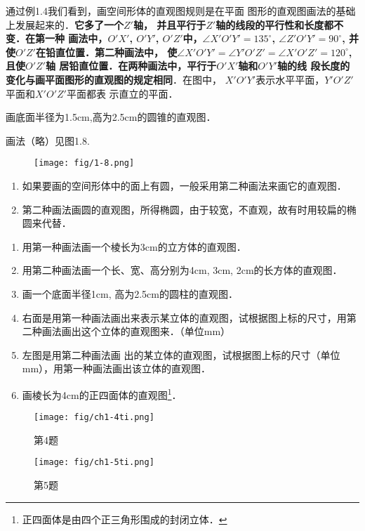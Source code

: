 通过例1.4我们看到，画空间形体的直观图规则是在平面
图形的直观图画法的基础上发展起来的．\textbf{它多了一个$Z'$轴，
并且平行于$Z'$轴的线段的平行性和长度都不变．在第一种
画法中，$O'X'$, $O'Y'$, $O'Z'$中，$\angle X'O'Y'=135^{\circ}$,
 $\angle Z'O'Y'=90^{\circ}$, 并使$O'Z'$在铅直位置．第二种画法中，
使$\angle X'O'Y'=\angle Y'O'Z'=\angle X'O'Z'=120^{\circ}$, 且使$O'Z'$轴
居铅直位置．在两种画法中，平行于$O'X'$轴和$O'Y'$轴的线
段长度的变化与画平面图形的直观图的规定相同}．在图中，
$X'O'Y'$表示水平平面，$Y'O'Z'$平面和$X'O'Z'$平面都表
示直立的平面．

\begin{example}
画底面半径为1.5cm,高为2.5cm的圆锥的直观图．

画法（略）见图1.8.
\begin{figure}[htp]
    \centering
    \texttt{[image: fig/1-8.png]}
    \caption{}
\end{figure}
\end{example}

\begin{rmk}
\begin{enumerate}
    \item 如果要画的空间形体中的面上有圆，一般采用第二种画法来画它的直观图．
    \item 第二种画法画圆的直观图，所得椭圆，由于较宽，不直观，故有时用较扁的椭圆来代替．
\end{enumerate}
\end{rmk}


\begin{ex}
\begin{enumerate}
    \item 用第一种画法画一个棱长为3cm的立方体的直观图．
    \item 用第二种画法画一个长、宽、高分别为4cm, 3cm, 2cm的长方体的直观图．
    \item 画一个底面半径1cm, 高为2.5cm的圆柱的直观图．
    \item 右面是用第一种画法画出来表示某立体的直观图，试根据图上标的尺寸，用第二种画法画出这个立体的直观图来．（单位mm）
    \item 左图是用第二种画法画
    出的某立体的直观图，试根据图上标的尺寸（单位mm），用第一种画法画出该立体的直观图．
    \item 画棱长为4cm的正四面体的直观图\footnote{正四面体是由四个正三角形围成的封闭立体．}．
\end{enumerate}
\end{ex}



\begin{figure}[htp]
    \centering
    \begin{minipage}[t]{0.48\textwidth}
    \centering
        \texttt{[image: fig/ch1-4ti.png]}
    \caption*{第4题}
    \end{minipage}
    \begin{minipage}[t]{0.48\textwidth}
    \centering
\texttt{[image: fig/ch1-5ti.png]}
    \caption*{第5题}
    \end{minipage}
  \end{figure}

